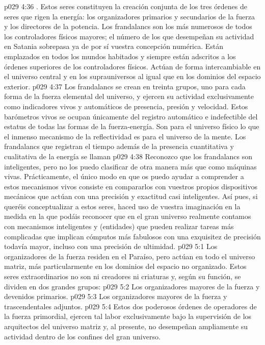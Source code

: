 \vs p029 4:36 . Estos seres constituyen la creación conjunta de los tres órdenes de seres que rigen la energía: los organizadores primarios y secundarios de la fuerza y los directores de la potencia. Los frandalancs son los más numerosos de todos los controladores físicos mayores; el número de los que desempeñan su actividad en Satania sobrepasa ya de por sí vuestra concepción numérica. Están emplazados en todos los mundos habitados y siempre están adscritos a los órdenes superiores de los controladores físicos. Actúan de forma intercambiable en el universo central y en los suprauniversos al igual que en los dominios del espacio exterior.
\vs p029 4:37 Los frandalancs se crean en treinta grupos, uno para cada forma de la fuerza elemental del universo, y ejercen su actividad exclusivamente como indicadores vivos y automáticos de presencia, presión y velocidad. Estos barómetros vivos se ocupan únicamente del registro automático e indefectible del estatus de todas las formas de la fuerza\hyp{}energía. Son para el universo físico lo que el inmenso mecanismo de la reflectividad es para el universo de la mente. Los frandalancs que registran el tiempo además de la presencia cuantitativa y cualitativa de la energía se llaman 
\vs p029 4:38 Reconozco que los frandalancs son inteligentes, pero no los puedo clasificar de otra manera más que como máquinas vivas. Prácticamente, el único modo en que os puedo ayudar a comprender a estos mecanismos vivos consiste en compararlos con vuestros propios dispositivos mecánicos que actúan con una precisión y exactitud casi inteligentes. Así pues, si queréis conceptualizar a estos seres, haced uso de vuestra imaginación en la medida en la que podáis reconocer que en el gran universo realmente contamos con mecanismos inteligentes y  (entidades) que pueden realizar tareas más complicadas que implican cómputos más fabulosos con una exquisitez de precisión todavía mayor, incluso con una precisión de ultimidad.
\vs p029 5:1 Los organizadores de la fuerza residen en el Paraíso, pero actúan en todo el universo matriz, más particularmente en los dominios del espacio no organizado. Estos seres extraordinarios no son ni creadores ni criaturas y, según su función, se dividen en dos grandes grupos:
\vs p029 5:2 Los organizadores mayores de la fuerza y devenidos primarios.
\vs p029 5:3 Los organizadores mayores de la fuerza y trascendentales adjuntos.
\vs p029 5:4 \pc Estos dos poderosos órdenes de operadores de la fuerza primordial, ejercen tal labor exclusivamente bajo la supervisión de los arquitectos del universo matriz y, al presente, no desempeñan ampliamente su actividad dentro de los confines del gran universo.
